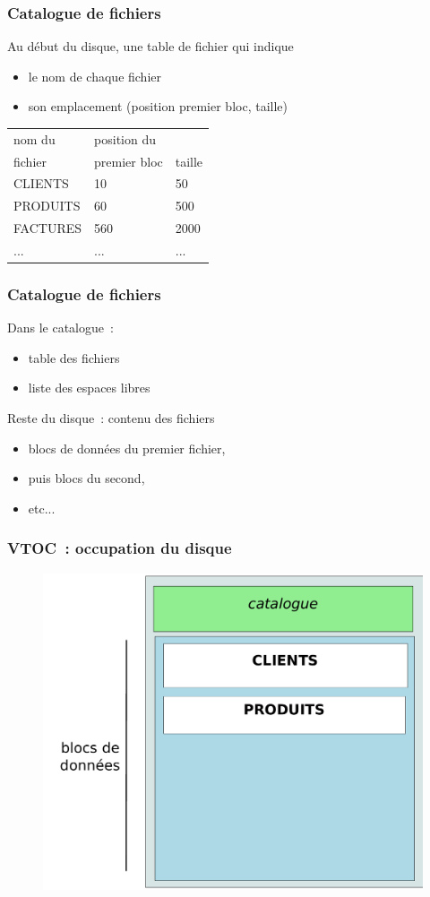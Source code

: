 \begin{frame}
  \frametitle{Catalogue de fichiers}
  Au début du disque, une \alert{table de fichier} qui indique
  \begin{itemize} 
  \item le \alert{nom} de chaque fichier
  \item son emplacement (\alert{position premier bloc, taille})
  \end{itemize}
  
  \begin{center}
    \begin{tabular}{|lll|}
      \hline
      \alert{nom} du     & position du & \\
      fichier & \alert{premier bloc} & \alert{taille} \\
      \hline
      CLIENTS & 10 & 50 \\ PRODUITS & 60 & 500 \\ FACTURES & 560 & 2000 \\ ... & ... &
      ... \\
      \hline
    \end{tabular}
  \end{center}
\end{frame}


\begin{frame}
\frametitle{Catalogue de fichiers}
Dans le catalogue~: 
\begin{itemize}
\item table des fichiers
\item liste des \alert{espaces libres}
\end{itemize}
\vspace{0.5cm}

Reste du disque~: contenu des fichiers
\begin{itemize}
\item blocs de données du premier fichier, 
\item puis blocs du second, 
\item etc...
\end{itemize}
\end{frame}
\begin{frame}

\frametitle{VTOC~: occupation du disque}
\begin{figure}
  \includegraphics[width=0.8\linewidth]{fig4/vtoc}
\end{figure}
\end{frame}


